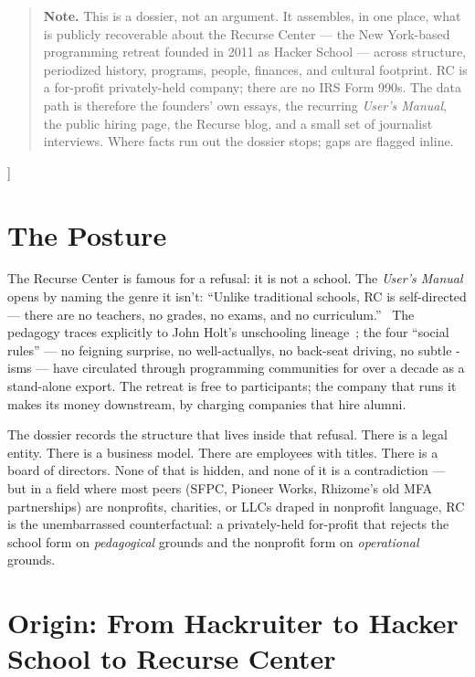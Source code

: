 \documentclass[10pt,letterpaper,twocolumn]{article}
\begin{document}
{\begin{quote}
\small\noindent\textbf{Note.} This is a dossier, not an argument. It assembles, in one place, what is publicly recoverable about the Recurse Center --- the New York-based programming retreat founded in 2011 as Hacker School --- across structure, periodized history, programs, people, finances, and cultural footprint. RC is a for-profit privately-held company; there are no IRS Form 990s. The data path is therefore the founders' own essays, the recurring \emph{User's Manual}, the public hiring page, the Recurse blog, and a small set of journalist interviews. Where facts run out the dossier stops; gaps are flagged inline.
\end{quote}
\vspace{0.5em}
}]

\section{The Posture}

The Recurse Center is famous for a refusal: it is not a school. The \emph{User's Manual} opens by naming the genre it isn't: ``Unlike traditional schools, RC is self-directed --- there are no teachers, no grades, no exams, and no curriculum.''~\citep{rcmanual} The pedagogy traces explicitly to John Holt's unschooling lineage~\citep{wikipediarc}; the four ``social rules'' --- no feigning surprise, no well-actuallys, no back-seat driving, no subtle -isms --- have circulated through programming communities for over a decade as a stand-alone export. The retreat is free to participants; the company that runs it makes its money downstream, by charging companies that hire alumni.

The dossier records the structure that lives inside that refusal. There is a legal entity. There is a business model. There are employees with titles. There is a board of directors. None of that is hidden, and none of it is a contradiction --- but in a field where most peers (SFPC, Pioneer Works, Rhizome's old MFA partnerships) are nonprofits, charities, or LLCs draped in nonprofit language, RC is the unembarrassed counterfactual: a privately-held for-profit that rejects the school form on \emph{pedagogical} grounds and the nonprofit form on \emph{operational} grounds.

\section{Origin: From Hackruiter to Hacker School to Recurse Center}
\end{document}
